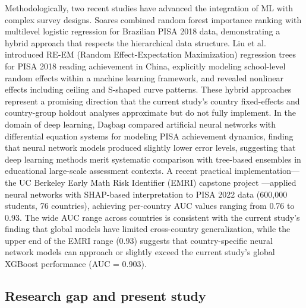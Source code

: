 \documentclass[pdflatex,sn-mathphys-ay]{sn-jnl}
\begin{document}
Methodologically, two recent studies have advanced the integration of ML with complex survey designs. Soares \citep{Soares_2024_brazil} combined random forest importance ranking with multilevel logistic regression for Brazilian PISA 2018 data, demonstrating a hybrid approach that respects the hierarchical data structure. Liu et al. \citep{Liu_2024_REEM} introduced RE-EM (Random Effect-Expectation Maximization) regression trees for PISA 2018 reading achievement in China, explicitly modeling school-level random effects within a machine learning framework, and revealed nonlinear effects including ceiling and S-shaped curve patterns. These hybrid approaches represent a promising direction that the current study's country fixed-effects and country-group holdout analyses approximate but do not fully implement. In the domain of deep learning, Daşbaşı \citep{Dasbasi_2025_dynamic} compared artificial neural networks with differential equation systems for modeling PISA achievement dynamics, finding that neural network models produced slightly lower error levels, suggesting that deep learning methods merit systematic comparison with tree-based ensembles in educational large-scale assessment contexts. A recent practical implementation---the UC Berkeley Early Math Risk Identifier (EMRI) capstone project \citep{EMRI_2025}---applied neural networks with SHAP-based interpretation to PISA 2022 data (600,000 students, 76 countries), achieving per-country AUC values ranging from 0.76 to 0.93. The wide AUC range across countries is consistent with the current study's finding that global models have limited cross-country generalization, while the upper end of the EMRI range (0.93) suggests that country-specific neural network models can approach or slightly exceed the current study's global XGBoost performance (AUC = 0.903).

\subsection{Research gap and present study}
\end{document}
